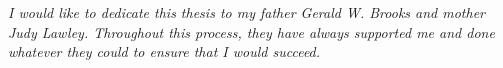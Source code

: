 \clearpage
\vspace*{\fill}
	\begin{center}
		\begin{minipage}{\textwidth}
		\emph{
                I would like to dedicate this thesis to my father Gerald W.
                Brooks and mother Judy Lawley. Throughout this process, they
                have always supported me and done whatever they could to ensure
                that I would succeed. 
			}
		\end{minipage}
	\end{center}
\vfill %
\clearpage
